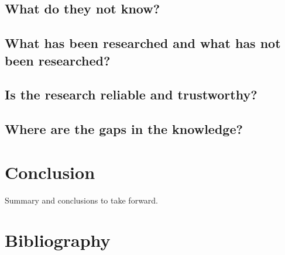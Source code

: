 \documentclass[a4paper, 11pt]{article}
\begin{document}
\subsection{What do they not know?}


\subsection{What has been researched and what has not been researched?}


\subsection{Is the research reliable and trustworthy?}


\subsection{Where are the gaps in the knowledge?}

\section{Conclusion}
Summary and conclusions to take forward.

\section{Bibliography}


\end{document}
